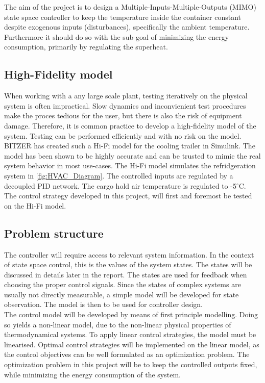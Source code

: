 The aim of the project is to design a Multiple-Inputs-Multiple-Outputs (MIMO) state space controller to keep the temperature inside the container constant despite exogenous inputs (disturbances), specifically the ambient temperature. Furthermore it should do so with the sub-goal of minimizing the energy consumption, primarily by regulating the superheat.\\





\subsection{High-Fidelity model}
When working with a any large scale plant, testing iteratively on the physical system is often impractical. Slow dynamics and inconvienient test procedures make the proces tedious for the user, but there is also the risk of equipment damage. Therefore, it is common practice to develop a high-fidelity model of the system. Testing can be performed efficiently and with no risk on the model. \\

BITZER has created such a Hi-Fi model for the cooling trailer in Simulink. The model has been shown to be highly accurate and can be trusted to mimic the real system behavior in most use-cases. The Hi-Fi model simulates the refridgeration system in \cref{fig:HVAC_Diagram}. The controlled inputs are regulated by a decoupled PID network. The cargo hold air temperature is regulated to -5$^{\circ}$C.\\

The control strategy developed in this project, will first and foremost be tested on the Hi-Fi model. 




\subsection{Problem structure}

The controller will require access to relevant system information. In the context of state space control, this is the values of the system states. The states will be discussed in details later in the report. The states are used for feedback when choosing the proper control signals. Since the states of complex systems are usually not directly measurable, a simple model will be developed for state observation. The model is then to be used for controller design. \\

The control model will be developed by means of first principle modelling. Doing so yields a non-linear model, due to the non-linear physical properties of thermodynamical systems. To apply linear control strategies, the model must be linearised. Optimal control strategies will be implemented on the linear model, as the control objectives can be well formulated as an optimization problem. The optimization problem in this project will be to keep the controlled outputs fixed, while minimizing the energy consumption of the system.\\


		
